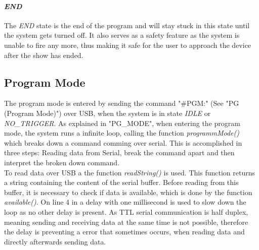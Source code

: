 

\paragraph{\textit{END}}
The \textit{END} state is the end of the program and will stay stuck in this state until the system gets turned off. It also serves as a safety feature as the system is unable to fire any more, thus making it safe for the user to approach the device after the show has ended.\\

\pagebreak


\subsection{Program Mode}
\label{Program Mode}

The program mode is entered by sending the command "\#PGM:" (See  "PG (Program Mode)") over USB, when the system is in state \textit{IDLE} or \textit{NO\_TRIGGER}. As explained in  "PG\_MODE",  when entering the program mode, the system runs a infinite loop, calling the function \textit{programmMode()} which breaks down a command comming over serial. This is accomplished in three steps: Reading data from Serial, break the command apart and then interpret the broken down command.\\



\noindent To read data over USB a the function \textit{readString()} is used. This function returns a string containing the content of the serial buffer. Before reading from this buffer, it is necessary to check if data is available, which is done by the function \textit{available()}. On line 4 in  a delay with one millisecond is used to slow down the loop as no other delay is present. As TTL serial communication is half duplex, meaning sending and receiving data at the same time is not possible, therefore the delay is preventing a error that sometimes occurs, when reading data and directly afterwards sending data.\\




